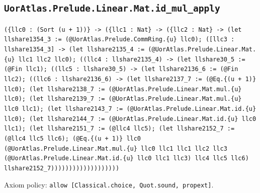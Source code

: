 \documentclass[11pt]{article}
\begin{document}
\subsection*{\texttt{UorAtlas.Prelude.Linear.Mat.id\_mul\_apply}}
\noindent\texttt{(\{llc0 : (Sort (u + 1))\} -> (\{llc1 : Nat\} -> (\{llc2 : Nat\} -> (let llshare1354\_3 := (@UorAtlas.Prelude.CommRing.\{u\} llc0); ([llc3 : llshare1354\_3] -> (let llshare2135\_4 := (@UorAtlas.Prelude.Linear.Mat.\{u\} llc1 llc2 llc0); ((llc4 : llshare2135\_4) -> (let llshare30\_5 := (@Fin llc1); ((llc5 : llshare30\_5) -> (let llshare2136\_6 := (@Fin llc2); ((llc6 : llshare2136\_6) -> (let llshare2137\_7 := (@Eq.\{(u + 1)\} llc0); (let llshare2138\_7 := (@UorAtlas.Prelude.Linear.Mat.mul.\{u\} llc0); (let llshare2139\_7 := (@UorAtlas.Prelude.Linear.Mat.mul.\{u\} llc0 llc1); (let llshare2143\_7 := (@UorAtlas.Prelude.Linear.Mat.id.\{u\} llc0); (let llshare2144\_7 := (@UorAtlas.Prelude.Linear.Mat.id.\{u\} llc0 llc1); (let llshare2151\_7 := (@llc4 llc5); (let llshare2152\_7 := (@llc4 llc5 llc6); (@Eq.\{(u + 1)\} llc0 (@UorAtlas.Prelude.Linear.Mat.mul.\{u\} llc0 llc1 llc1 llc2 llc3 (@UorAtlas.Prelude.Linear.Mat.id.\{u\} llc0 llc1 llc3) llc4 llc5 llc6) llshare2152\_7)))))))))))))))))))}\par
\noindent Axiom policy: \texttt{allow [Classical.choice, Quot.sound, propext]}.\par
\end{document}
